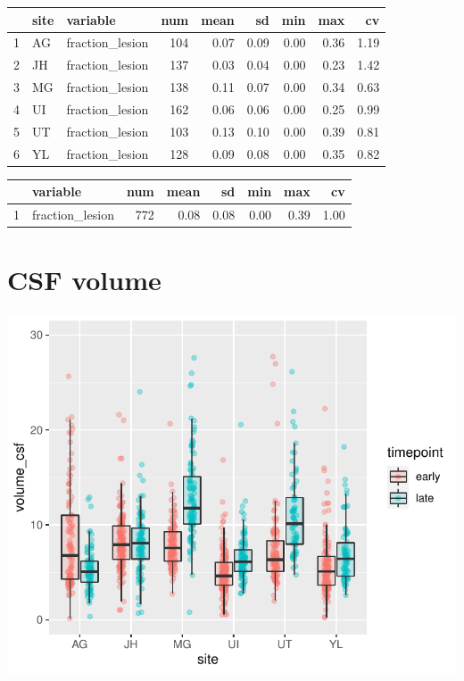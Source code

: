 \documentclass[
]{article}
\begin{document}
\begin{table}[ht]
\centering
\begin{tabular}{rllrrrrrr}
  \hline
 & site & variable & num & mean & sd & min & max & cv \\ 
  \hline
1 & AG & fraction\_lesion & 104 & 0.07 & 0.09 & 0.00 & 0.36 & 1.19 \\ 
  2 & JH & fraction\_lesion & 137 & 0.03 & 0.04 & 0.00 & 0.23 & 1.42 \\ 
  3 & MG & fraction\_lesion & 138 & 0.11 & 0.07 & 0.00 & 0.34 & 0.63 \\ 
  4 & UI & fraction\_lesion & 162 & 0.06 & 0.06 & 0.00 & 0.25 & 0.99 \\ 
  5 & UT & fraction\_lesion & 103 & 0.13 & 0.10 & 0.00 & 0.39 & 0.81 \\ 
  6 & YL & fraction\_lesion & 128 & 0.09 & 0.08 & 0.00 & 0.35 & 0.82 \\ 
   \hline
\end{tabular}
\end{table}
\begin{table}[ht]
\centering
\begin{tabular}{rlrrrrrr}
  \hline
 & variable & num & mean & sd & min & max & cv \\ 
  \hline
1 & fraction\_lesion & 772 & 0.08 & 0.08 & 0.00 & 0.39 & 1.00 \\ 
   \hline
\end{tabular}
\end{table}

\hypertarget{csf-volume}{%
\section{CSF volume}\label{csf-volume}}

\begin{center}\includegraphics{paper_files/figure-latex/plot_csf_both-1} \end{center}
\end{document}
